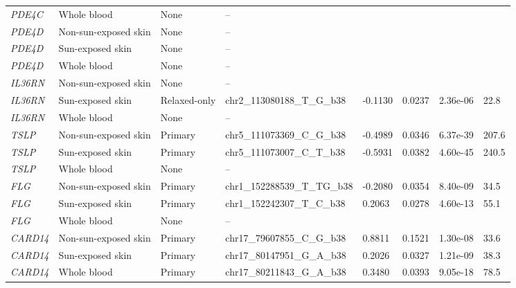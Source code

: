 \documentclass[10pt,a4paper]{article}
\begin{document}
\begin{landscape}
\begin{longtable}{p{1.7cm}p{3.3cm}p{2.2cm}p{5.0cm}p{1.8cm}p{1.8cm}p{2.2cm}p{1.3cm}}
\textit{PDE4C} & Whole blood & None & -- &  &  &  &  \\
\textit{PDE4D} & Non-sun-exposed skin & None & -- &  &  &  &  \\
\textit{PDE4D} & Sun-exposed skin & None & -- &  &  &  &  \\
\textit{PDE4D} & Whole blood & None & -- &  &  &  &  \\
\textit{IL36RN} & Non-sun-exposed skin & None & -- &  &  &  &  \\
\textit{IL36RN} & Sun-exposed skin & Relaxed-only & chr2\_113080188\_T\_G\_b38 & -0.1130 & 0.0237 & 2.36e-06 & 22.8 \\
\textit{IL36RN} & Whole blood & None & -- &  &  &  &  \\
\textit{TSLP} & Non-sun-exposed skin & Primary & chr5\_111073369\_C\_G\_b38 & -0.4989 & 0.0346 & 6.37e-39 & 207.6 \\
\textit{TSLP} & Sun-exposed skin & Primary & chr5\_111073007\_C\_T\_b38 & -0.5931 & 0.0382 & 4.60e-45 & 240.5 \\
\textit{TSLP} & Whole blood & None & -- &  &  &  &  \\
\textit{FLG} & Non-sun-exposed skin & Primary & chr1\_152288539\_T\_TG\_b38 & -0.2080 & 0.0354 & 8.40e-09 & 34.5 \\
\textit{FLG} & Sun-exposed skin & Primary & chr1\_152242307\_T\_C\_b38 & 0.2063 & 0.0278 & 4.60e-13 & 55.1 \\
\textit{FLG} & Whole blood & None & -- &  &  &  &  \\
\textit{CARD14} & Non-sun-exposed skin & Primary & chr17\_79607855\_C\_G\_b38 & 0.8811 & 0.1521 & 1.30e-08 & 33.6 \\
\textit{CARD14} & Sun-exposed skin & Primary & chr17\_80147951\_G\_A\_b38 & 0.2026 & 0.0327 & 1.21e-09 & 38.3 \\
\textit{CARD14} & Whole blood & Primary & chr17\_80211843\_G\_A\_b38 & 0.3480 & 0.0393 & 9.05e-18 & 78.5 \\
\end{longtable}
\end{landscape}
\end{document}
